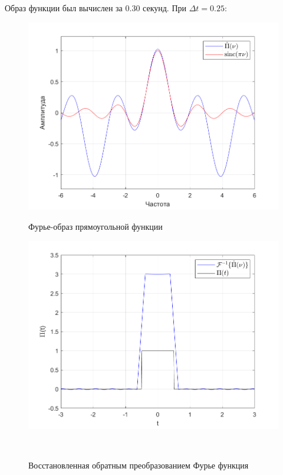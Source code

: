 \documentclass[a4paper]{article}
\begin{document}
Образ функции был вычислен за 0.30 секунд. При $\Delta t = 0.25$:

\begin{figure}[H]
    \begin{minipage}{0.5\textwidth}
        \centering \includegraphics[width=\textwidth]{graphs/1/T_10_dt_0.25_V_12_dv_0.001/fourier_numerical.png}
        \caption{Фурье-образ прямоугольной функции}
    \end{minipage}\hfill
    \begin{minipage}{0.5\textwidth}
        \centering \includegraphics[width=\textwidth]{graphs/1/T_10_dt_0.25_V_12_dv_0.001/func_inversed_fourier.png}
        \caption{Восстановленная обратным преобразованием Фурье функция}
    \end{minipage}\\[1em]
\end{figure}\noindent\
\end{document}
